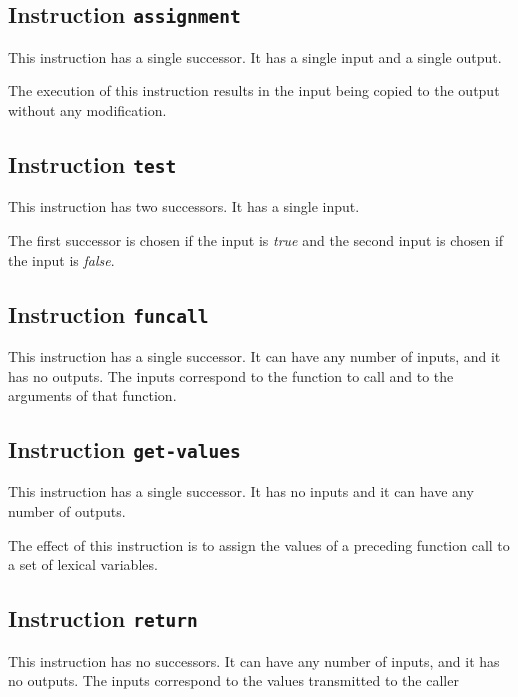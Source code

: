 \subsection{Instruction \texttt{assignment}}
\label{mir-instruction-assignment}

This instruction has a single successor.  It has a single input and a
single output. 

The execution of this instruction results in the input being copied to
the output without any modification. 

\subsection{Instruction \texttt{test}}
\label{mir-instruction-test}

This instruction has two successors.  It has a single input. 

The first successor is chosen if the input is \emph{true} and the
second input is chosen if the input is \emph{false}.%

\subsection{Instruction \texttt{funcall}}
\label{mir-instruction-funcall}

This instruction has a single successor.  It can have any number of
inputs, and it has no outputs.  The inputs correspond to the function
to call and to the arguments of that function.

\subsection{Instruction \texttt{get-values}}
\label{mir-instruction-get-values}

This instruction has a single successor.  It has no inputs and it can
have any number of outputs.

The effect of this instruction is to assign the values of a preceding
function call to a set of lexical variables. 

\subsection{Instruction \texttt{return}}
\label{mir-instruction-return}

This instruction has no successors.  It can have any number of
inputs, and it has no outputs.  The inputs correspond to the values
transmitted to the caller

